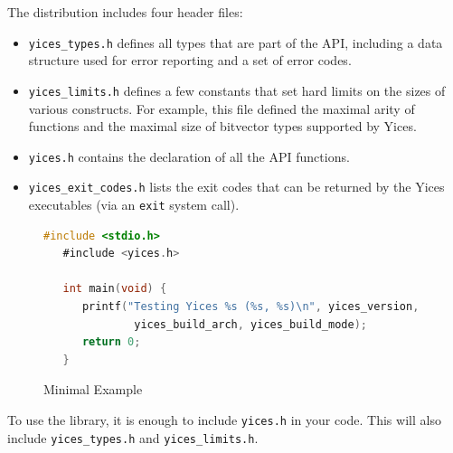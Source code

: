 \documentclass[11pt,twoside,fleqn,openright,titlepage]{cslreport}
\begin{document}
The distribution includes four header files:
\begin{itemize}
\item \texttt{yices\_types.h} defines all types that are part of the API,
including a data structure used for error reporting and a set of error codes.
\item \texttt{yices\_limits.h} defines a few constants that set hard
  limits on the sizes of various constructs. For example, this file
  defined the maximal arity of functions and the maximal size of
  bitvector types supported by Yices.
\item \texttt{yices.h} contains the declaration of all the API functions.
\item \texttt{yices\_exit\_codes.h} lists the exit codes that can be
  returned by the Yices executables (via an \texttt{exit} system call).
\end{itemize}

\begin{figure}
\begin{footnotesize}
\begin{lstlisting}[language=C,otherkeywords={\#include},keywordstyle=\color{blue},stringstyle=\color{red}]
   #include <stdio.h>
   #include <yices.h>

   int main(void) {
      printf("Testing Yices %s (%s, %s)\n", yices_version,
              yices_build_arch, yices_build_mode);
      return 0;
   }
\end{lstlisting}
\end{footnotesize}
\caption{Minimal Example}
\label{minimal}
\end{figure}

\noindent
To use the library, it is enough to include \texttt{yices.h} in your
code. This will also include \texttt{yices\_types.h} and
\texttt{yices\_limits.h}.
\end{document}
